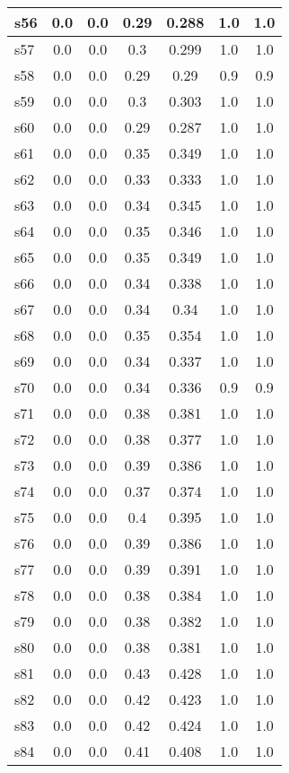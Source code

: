 \documentclass{article}
\begin{document}
\begin{tabular}{|l|c|c|c|c|c|c|}
\hline
s56 &0.0 & 0.0 & 0.29 & 0.288 & 1.0 & 1.0\\
\hline
s57 &0.0 & 0.0 & 0.3 & 0.299 & 1.0 & 1.0\\
\hline
s58 &0.0 & 0.0 & 0.29 & 0.29 & 0.9 & 0.9\\
\hline
s59 &0.0 & 0.0 & 0.3 & 0.303 & 1.0 & 1.0\\
\hline
s60 &0.0 & 0.0 & 0.29 & 0.287 & 1.0 & 1.0\\
\hline
s61 &0.0 & 0.0 & 0.35 & 0.349 & 1.0 & 1.0\\
\hline
s62 &0.0 & 0.0 & 0.33 & 0.333 & 1.0 & 1.0\\
\hline
s63 &0.0 & 0.0 & 0.34 & 0.345 & 1.0 & 1.0\\
\hline
s64 &0.0 & 0.0 & 0.35 & 0.346 & 1.0 & 1.0\\
\hline
s65 &0.0 & 0.0 & 0.35 & 0.349 & 1.0 & 1.0\\
\hline
s66 &0.0 & 0.0 & 0.34 & 0.338 & 1.0 & 1.0\\
\hline
s67 &0.0 & 0.0 & 0.34 & 0.34 & 1.0 & 1.0\\
\hline
s68 &0.0 & 0.0 & 0.35 & 0.354 & 1.0 & 1.0\\
\hline
s69 &0.0 & 0.0 & 0.34 & 0.337 & 1.0 & 1.0\\
\hline
s70 &0.0 & 0.0 & 0.34 & 0.336 & 0.9 & 0.9\\
\hline
s71 &0.0 & 0.0 & 0.38 & 0.381 & 1.0 & 1.0\\
\hline
s72 &0.0 & 0.0 & 0.38 & 0.377 & 1.0 & 1.0\\
\hline
s73 &0.0 & 0.0 & 0.39 & 0.386 & 1.0 & 1.0\\
\hline
s74 &0.0 & 0.0 & 0.37 & 0.374 & 1.0 & 1.0\\
\hline
s75 &0.0 & 0.0 & 0.4 & 0.395 & 1.0 & 1.0\\
\hline
s76 &0.0 & 0.0 & 0.39 & 0.386 & 1.0 & 1.0\\
\hline
s77 &0.0 & 0.0 & 0.39 & 0.391 & 1.0 & 1.0\\
\hline
s78 &0.0 & 0.0 & 0.38 & 0.384 & 1.0 & 1.0\\
\hline
s79 &0.0 & 0.0 & 0.38 & 0.382 & 1.0 & 1.0\\
\hline
s80 &0.0 & 0.0 & 0.38 & 0.381 & 1.0 & 1.0\\
\hline
s81 &0.0 & 0.0 & 0.43 & 0.428 & 1.0 & 1.0\\
\hline
s82 &0.0 & 0.0 & 0.42 & 0.423 & 1.0 & 1.0\\
\hline
s83 &0.0 & 0.0 & 0.42 & 0.424 & 1.0 & 1.0\\
\hline
s84 &0.0 & 0.0 & 0.41 & 0.408 & 1.0 & 1.0\\

\end{tabular}
\end{document}
